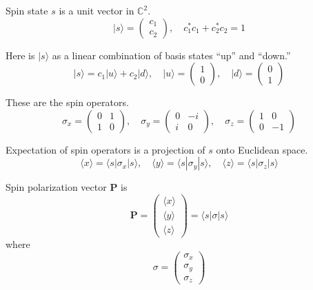 \documentclass[12pt]{article}
\begin{document}
Spin state $s$ is a unit vector in $\mathbb{C}^2$.
\begin{equation*}
|s\rangle=\begin{pmatrix}c_1\\c_2\end{pmatrix},
\quad
c_1^*c_1+c_2^*c_2=1
\end{equation*}

Here is $|s\rangle$ as a linear combination of basis states ``up'' and ``down.''
\begin{equation*}
|s\rangle=c_1|u\rangle+c_2|d\rangle,
\quad
|u\rangle=\begin{pmatrix}1\\0\end{pmatrix},
\quad
|d\rangle=\begin{pmatrix}0\\1\end{pmatrix}
\end{equation*}

These are the spin operators.
\begin{equation*}
\sigma_x=\begin{pmatrix}0&1\\1&0\end{pmatrix},
\quad
\sigma_y=\begin{pmatrix}0&-i\\i&0\end{pmatrix},
\quad
\sigma_z=\begin{pmatrix}1&0\\0&-1\end{pmatrix}
\end{equation*}

Expectation of spin operators is a projection of $s$ onto Euclidean space.
\begin{equation*}
\langle x\rangle=\langle s|\sigma_x|s\rangle,
\quad
\langle y\rangle=\langle s|\sigma_y|s\rangle,
\quad
\langle z\rangle=\langle s|\sigma_z|s\rangle
\end{equation*}

Spin polarization vector $\mathbf P$ is
\begin{equation*}
\mathbf P=\begin{pmatrix}\langle x\rangle\\\langle y\rangle\\\langle z\rangle\end{pmatrix}
=\langle s|\sigma|s\rangle
\end{equation*}
where
\begin{equation*}
\sigma=\begin{pmatrix}\sigma_x\\\sigma_y\\\sigma_z\end{pmatrix}
\end{equation*}
\end{document}
